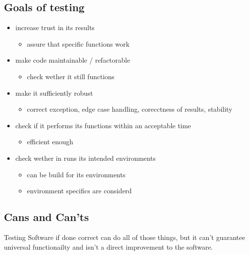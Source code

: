 \documentclass[a4paper]{scrbook}
\begin{document}
        \subsection{Goals of testing}
        \begin{itemize}
            \item increase trust in its results
            \begin{itemize}
                \item assure that specific functions work
            \end{itemize}
            \item make code maintainable / refactorable
            \begin{itemize}
                \item check wether it still functions
            \end{itemize}
            \item make it sufficiently robust
            \begin{itemize}
                \item correct exception, edge case handling, corecctness of results, stability
            \end{itemize}
            \item check if it performs its functions within an acceptable time
            \begin{itemize}
                \item efficient enough
            \end{itemize}
            \item check wether in runs its intended environments
            \begin{itemize}
                \item can be build for its environments
                \item environment specifics are considerd
            \end{itemize}
        \end{itemize}
        \subsection{Cans and Can'ts}
        Testing Software if done correct can do all of those things, but it can't guarantee universal functionailty and isn't a direct improvement to the software.
\end{document}
